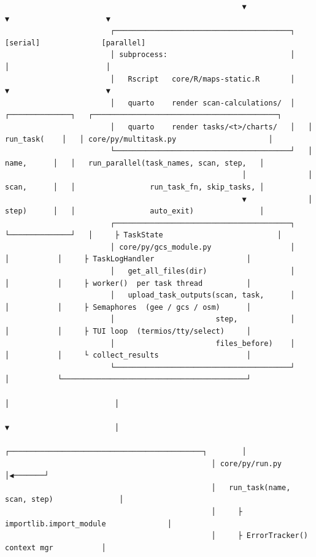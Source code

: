 \documentclass[
  letterpaper,
  DIV=11,
  numbers=noendperiod]{scrreprt}
\begin{document}
\begin{verbatim}
                                                      ▼                 ▼                      ▼
                        ┌────────────────────────────────────────┐   [serial]              [parallel]
                        │ subprocess:                            │      │                      │
                        │   Rscript   core/R/maps-static.R       │      ▼                      ▼
                        │   quarto    render scan-calculations/  │   ┌──────────────┐   ┌──────────────────────────────────────────┐
                        │   quarto    render tasks/<t>/charts/   │   │ run_task(    │   │ core/py/multitask.py                     │
                        └────────────────────────────────────────┘   │   name,      │   │   run_parallel(task_names, scan, step,   │
                                                      │              │   scan,      │   │                 run_task_fn, skip_tasks, │
                                                      ▼              │   step)      │   │                 auto_exit)               │
                        ┌────────────────────────────────────────┐   └──────────────┘   │     ├ TaskState                          │
                        │ core/py/gcs_module.py                  │          │           │     ├ TaskLogHandler                     │
                        │   get_all_files(dir)                   │          │           │     ├ worker()  per task thread          │
                        │   upload_task_outputs(scan, task,      │          │           │     ├ Semaphores  (gee / gcs / osm)      │
                        │                       step,            │          │           │     ├ TUI loop  (termios/tty/select)     │
                        │                       files_before)    │          │           │     └ collect_results                    │
                        └────────────────────────────────────────┘          │           └──────────────────────────────────────────┘
                                                                            │                        │
                                                                            ▼                        │
                                               ┌────────────────────────────────────────────┐        │
                                               │ core/py/run.py                             │◀───────┘
                                               │   run_task(name, scan, step)               │
                                               │     ├ importlib.import_module              │
                                               │     ├ ErrorTracker() context mgr           │

\end{verbatim}
\end{document}
